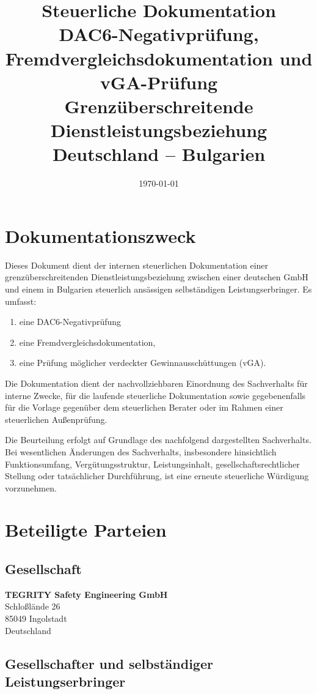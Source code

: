 \documentclass[11pt,a4paper]{article}
\title{
    \textbf{Steuerliche Dokumentation}\\
    \large DAC6-Negativprüfung, Fremdvergleichsdokumentation und vGA-Prüfung\\
    \vspace{0.5em}
    \normalsize Grenzüberschreitende Dienstleistungsbeziehung Deutschland -- Bulgarien
}
\author{}
\date{\today}
\begin{document}
\maketitle

\section*{Dokumentationszweck}

Dieses Dokument dient der internen steuerlichen Dokumentation einer grenzüberschreitenden Dienstleistungsbeziehung zwischen einer deutschen GmbH und einem in Bulgarien steuerlich ansässigen selbständigen Leistungserbringer. Es umfasst:

\begin{enumerate}
    \item eine DAC6-Negativprüfung
    \item eine Fremdvergleichsdokumentation,
    \item eine Prüfung möglicher verdeckter Gewinnausschüttungen (vGA).
\end{enumerate}

Die Dokumentation dient der nachvollziehbaren Einordnung des Sachverhalts für interne Zwecke, für die laufende steuerliche Dokumentation sowie gegebenenfalls für die Vorlage gegenüber dem steuerlichen Berater oder im Rahmen einer steuerlichen Außenprüfung.

Die Beurteilung erfolgt auf Grundlage des nachfolgend dargestellten Sachverhalts. Bei wesentlichen Änderungen des Sachverhalts, insbesondere hinsichtlich Funktionsumfang, Vergütungsstruktur, Leistungsinhalt, gesellschaftsrechtlicher Stellung oder tatsächlicher Durchführung, ist eine erneute steuerliche Würdigung vorzunehmen.

\section{Beteiligte Parteien}

\subsection{Gesellschaft}

\textbf{TEGRITY Safety Engineering GmbH}\\
Schloßlände 26\\
85049 Ingolstadt\\
Deutschland

\subsection{Gesellschafter und selbständiger Leistungserbringer}
\end{document}
